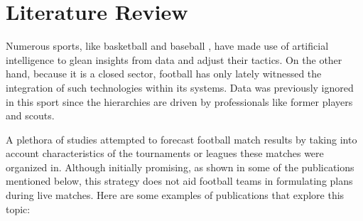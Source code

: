 \chapter{Literature Review}\label{lit}
Numerous sports, like basketball \cite{skinner2010price} and baseball \cite{albert2010baseball}, have made use of artificial intelligence to glean insights from data and adjust their tactics. On the other hand, because it is a closed sector, football has only lately witnessed the integration of such technologies within its systems.
Data was previously ignored in this sport since the hierarchies are driven by professionals like former players and scouts. \cite{kuper2018soccernomics}

A plethora of studies attempted to forecast football match results by taking into account characteristics of the tournaments or leagues these matches were organized in. Although initially promising, as shown in some of the publications mentioned below, this strategy does not aid football teams in formulating plans during live matches.
Here are some examples of publications that explore this topic: 
